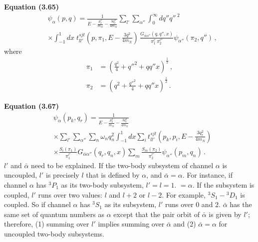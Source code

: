 \documentclass[11pt,aps]{revtex4}
\begin{document}
\textbf{Equation (3.65)}
\begin{equation}
  \begin{aligned}
  & \psi_{\alpha}(p, q) = \frac{1}{E - \frac{p_{k}^2}{m_N} - \frac{3q_r^2}{4m_N}} \sum_{l'}\sum_{\alpha''} \int_0^\infty dq'' {q''\,}^2 \\
  & \times \int_{-1}^1{dx} \; t_{ll'}^{sjt} (p, \pi_1, E - \frac{3q^2}{4m_N})\, \frac{G_{\bar{\alpha}\alpha''}(q, q'', x)}{\pi_1^{l'} \, \pi_2^{l''} } \psi_{\alpha''}(\pi_2, q'') \, ,
  \end{aligned}
\end{equation}
where
\begin{equation}
\begin{split}
  \pi_1 &= \left(\frac{q^2}{4} + {q''}^2 + q q'' x \right)^{\frac{1}{2}}\, , \\
  \pi_2 &= \left(q^2 + \frac{{q''}^2}{4} + q q'' x \right)^{\frac{1}{2}} \, .
\end{split}
\end{equation}

\textbf{Equation (3.67)}
\begin{equation}
  \begin{aligned}
  & \psi_{\alpha}(p_{k}, q_r) = \frac{1}{E - \frac{p_{k}^2}{m_N} - \frac{3q_r^2}{4m_N}} \\
  & \times \sum_{l'}\sum_{\alpha''}\sum_{n} \omega_{n} q_n^2 \int_{-1}^1{dx} \sum_i t_{ll'}^{sjt}\left(p_k, p_i, E - \frac{3q_r^2}{4m_N}\right) \\
  & \times \frac{S_i(\pi_1)}{\pi_1^{l'}}G_{\bar{\alpha}\alpha''}(q_r, q_n, x) \sum_m \frac{S_m(\pi_2)}{\pi_2^{l''}} \psi_{\alpha''}(p_m, q_n) \, .
  \end{aligned}
\end{equation}
$l'$ and $\bar{\alpha}$ need to be explained. If the two-body subsystem of channel $\alpha$ is uncoupled, $l'$ is precisely $l$ that is defined by $\alpha$, and $\bar{\alpha} = \alpha$.
For instance, if channel $\alpha$ has $^3P_1$ as its two-body subsystem, $l' = l = 1$.  $   = \alpha$. If the subsystem is coupled, $l'$ runs over two values: $l$ and $l + 2$ or $l - 2$. For example, $^3S_1 - {}^3D_1$ is coupled. So if channel $\alpha$ has $^3S_1$ as its subsystem, $l'$ runs over $0$ and $2$. $\bar{\alpha}$ has the same set of quantum numbers as $\alpha$ except that the pair orbit of $\bar{\alpha}$ is given by $l'$; therefore, (1) summing over $l'$ implies summing over $\bar{\alpha}$ and (2) $\bar{\alpha} = \alpha$ for uncoupled two-body subsystems.
\end{document}
